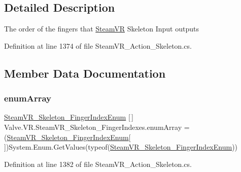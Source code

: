\subsection{Detailed Description}
The order of the fingers that \mbox{\hyperlink{class_valve_1_1_v_r_1_1_steam_v_r}{Steam\+VR}} Skeleton Input outputs 



Definition at line 1374 of file Steam\+V\+R\+\_\+\+Action\+\_\+\+Skeleton.\+cs.



\subsection{Member Data Documentation}
\mbox{\label{class_valve_1_1_v_r_1_1_steam_v_r___skeleton___finger_indexes_a21b412e300052bb5467501733c268faa}} 
\subsubsection{\texorpdfstring{enumArray}{enumArray}}
{\footnotesize\ttfamily \mbox{\hyperlink{namespace_valve_1_1_v_r_ac40c4bdf0a3dcd6e69cad2d85f287c67}{Steam\+V\+R\+\_\+\+Skeleton\+\_\+\+Finger\+Index\+Enum}} \mbox{[}$\,$\mbox{]} Valve.\+V\+R.\+Steam\+V\+R\+\_\+\+Skeleton\+\_\+\+Finger\+Indexes.\+enum\+Array = (\mbox{\hyperlink{namespace_valve_1_1_v_r_ac40c4bdf0a3dcd6e69cad2d85f287c67}{Steam\+V\+R\+\_\+\+Skeleton\+\_\+\+Finger\+Index\+Enum}}\mbox{[}$\,$\mbox{]})System.\+Enum.\+Get\+Values(typeof(\mbox{\hyperlink{namespace_valve_1_1_v_r_ac40c4bdf0a3dcd6e69cad2d85f287c67}{Steam\+V\+R\+\_\+\+Skeleton\+\_\+\+Finger\+Index\+Enum}}))\hspace{0.3cm}{\ttfamily [static]}}



Definition at line 1382 of file Steam\+V\+R\+\_\+\+Action\+\_\+\+Skeleton.\+cs.

\mbox{\label{class_valve_1_1_v_r_1_1_steam_v_r___skeleton___finger_indexes_a2d11738e57d8295c478ca3b57f5680e4}} 
